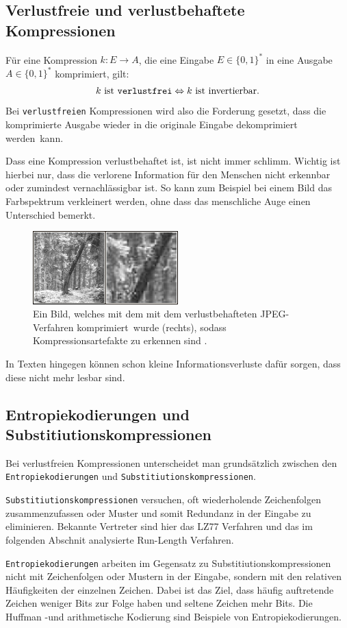 \documentclass{article}
\newcommand{\Llr}{\Leftrightarrow}
\newcommand{\para}{\par\null\par}
\begin{document}
\subsection{Verlustfreie und verlustbehaftete Kompressionen}
Für eine Kompression $k: E \to A$, die eine Eingabe $E \in \{0,1\}^*$ in eine Ausgabe $A \in \{0,1\}^*$
komprimiert, gilt:
\[k \text{ ist \texttt{verlustfrei}} \Llr k \text{ ist invertierbar}.\]
Bei \texttt{verlustfreien} Kompressionen wird also die Forderung gesetzt, dass die 
komprimierte Ausgabe wieder in die originale Eingabe dekomprimiert werden~kann.
\para
Dass eine Kompression verlustbehaftet ist, ist nicht immer schlimm. Wichtig ist hierbei nur, 
dass die verlorene Information für den Menschen nicht erkennbar oder zumindest 
vernachlässigbar ist. So kann zum Beispiel bei einem Bild das Farbspektrum 
verkleinert werden, ohne dass das menschliche Auge einen Unterschied bemerkt.
\begin{figure}[H]
    \centering
    \includegraphics*[width=0.5\textwidth]{images/jpeg.jpg}
    \caption[Verlustbehaftete Kompression eines Bildes]{
        Ein Bild, welches mit dem mit dem verlustbehafteten JPEG-Verfahren komprimiert~wurde (rechts), 
        sodass Kompressionsartefakte zu erkennen sind \cite*{jpeg}.
    }
\end{figure}
In Texten hingegen können schon kleine Informationsverluste dafür sorgen, 
dass diese nicht mehr lesbar sind.
\subsection{Entropiekodierungen und Substitiutionskompressionen}
Bei verlustfreien Kompressionen unterscheidet man grundsätzlich zwischen den
\texttt{Entropiekodierungen} und \texttt{Substitiutionskompressionen}.
\para
\texttt{Substitiutionskompressionen} versuchen, oft wiederholende Zeichenfolgen 
zusammenzufassen oder Muster und somit Redundanz in der Eingabe zu eliminieren. Bekannte Vertreter
sind hier das LZ77 Verfahren und das im folgenden Abschnit analysierte Run-Length Verfahren.
\para
\texttt{Entropiekodierungen} arbeiten im Gegensatz zu Substitiutionskompressionen nicht 
mit Zeichenfolgen oder Mustern in der Eingabe, sondern mit den relativen Häufigkeiten
der einzelnen Zeichen. Dabei ist das Ziel, dass häufig auftretende Zeichen weniger
Bits zur Folge haben und seltene Zeichen mehr Bits.
Die Huffman -und arithmetische Kodierung sind Beispiele von Entropiekodierungen.
\end{document}
